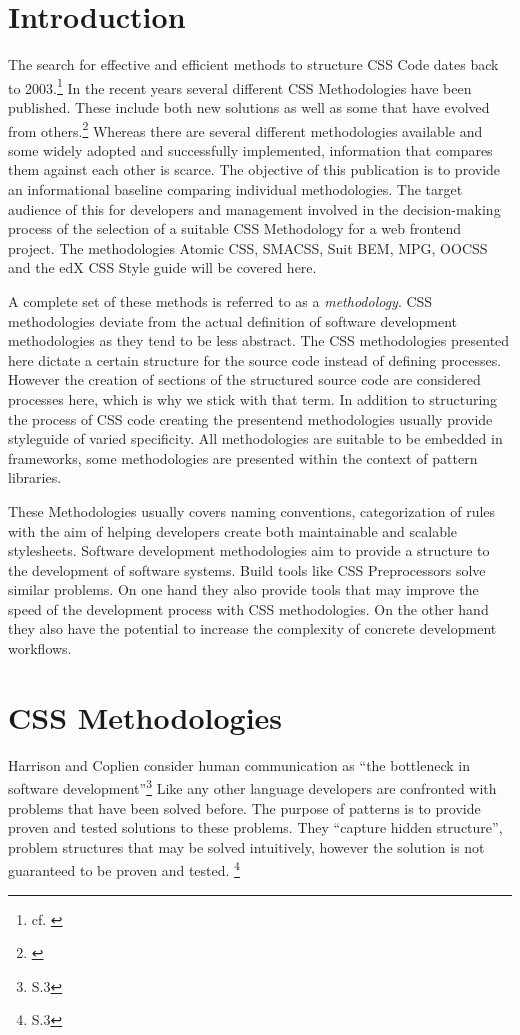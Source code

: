 \chapter{Introduction}
The search for effective and efficient methods to structure CSS Code dates back to 2003.\footnote{cf. \cite{methodmails}}
In the recent years several different CSS Methodologies have been published.
These include both new solutions as well as some that have evolved from others.\footnote{\cite{methodologyoverview}}
Whereas there are several different methodologies available and some widely adopted and successfully implemented, information that compares them against each other is scarce.
The objective of this publication is to provide an informational baseline comparing individual methodologies.
The target audience of this for developers and management involved in the decision-making process of the selection of a suitable CSS Methodology for a web frontend project.
The methodologies Atomic CSS, SMACSS, Suit BEM, MPG, OOCSS and the edX CSS Style guide will be covered here.


A complete set of these methods is referred to as a {\slshape methodology}.
CSS methodologies deviate from the actual definition of software development methodologies as they tend to be less abstract.
The CSS methodologies presented here dictate a certain structure for the source code instead of defining processes.
However the creation of sections of the structured source code are considered processes here, which is why we stick with that term.
In addition to structuring the process of CSS code creating the presentend methodologies usually provide styleguide of varied specificity.
All methodologies are suitable to be embedded in frameworks, some methodologies are presented within the context of pattern libraries.


These Methodologies usually covers naming conventions, categorization of rules with the aim of helping developers create both maintainable and scalable stylesheets.
Software development methodologies aim to provide a structure to the development of software systems.
Build tools like CSS Preprocessors solve similar problems.
On one hand they also provide tools that may improve the speed of the development process with CSS methodologies.
On the other hand they also have the potential to increase the complexity of concrete development workflows.

\chapter{CSS Methodologies}
Harrison and Coplien consider human communication as ``the bottleneck in software development''\footnote{\cite{coplien2004organizational} S.3}
Like any other language developers are confronted with problems that have been solved before.
The purpose of patterns is to provide proven and tested solutions to these problems.
They ``capture hidden structure'', problem structures that may be solved intuitively, however the solution is not guaranteed to be proven and tested. \footnote{\cite{coplien2004organizational} S.3}

